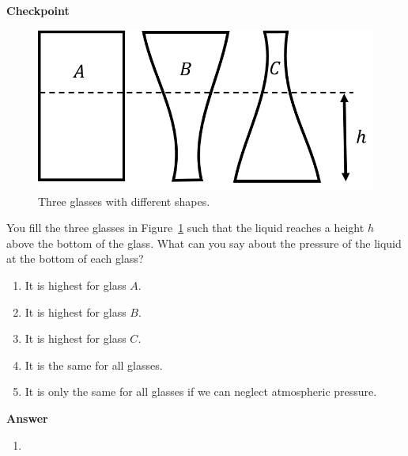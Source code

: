 \begin{framed}
\textbf{Checkpoint}\\
\begin{figure}[!htbp]
\centering
\includegraphics[width=0.4\linewidth]{files/glasses-f971074bb518c1c63523f0c7b808c680.png}
\caption[]{Three glasses with different shapes.}
\label{fig:fluidmechanics:glasses}
\end{figure}

You fill the three glasses in Figure~\ref{fig:fluidmechanics:glasses} such that the liquid reaches a height $h$ above the bottom of the glass. What can you say about the pressure of the liquid at the bottom of each glass?

\begin{enumerate}
\item It is highest for glass $A$.
\item It is highest for glass $B$.
\item It is highest for glass $C$.
\item It is the same for all glasses.
\item It is only the same for all glasses if we can neglect atmospheric pressure.
\end{enumerate}

\begin{framed}
\textbf{Answer}\\
\begin{enumerate}[resume]
\item
\end{enumerate}
\end{framed}
\end{framed}

